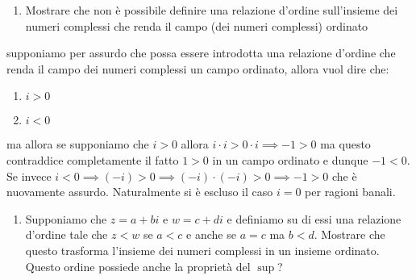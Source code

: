 \documentclass{report}
\begin{document}
\begin{enumerate}[resume, label=\protect\circled{\arabic*}]
	\item Mostrare che non è possibile definire una relazione d'ordine sull'insieme dei numeri complessi che renda il campo (dei numeri complessi) ordinato
\end{enumerate}
\begin{mysolution}
	supponiamo per assurdo che possa essere introdotta una relazione d'ordine che renda il campo dei numeri complessi un campo ordinato, allora vuol dire che:
	\begin{enumerate}[label=\protect\circled{\arabic*}]
		\item $i > 0$
		\item $i < 0$
	\end{enumerate}
	ma allora se supponiamo che $i>0$ allora $i \cdot i > 0 \cdot i \implies -1 > 0$ ma questo contraddice completamente il fatto $1 > 0$ in un campo ordinato e dunque $-1 < 0$. Se invece $i < 0 \implies (-i) > 0 \implies (-i) \cdot (-i) > 0 \implies -1 > 0$ che è nuovamente assurdo. Naturalmente si è escluso il caso $i = 0$ per ragioni banali.
\end{mysolution}
\begin{enumerate}[resume, label=\protect\circled{\arabic*}]
	\item Supponiamo che $z=a+bi$ e $w=c+di$ e definiamo su di essi una relazione d'ordine tale che $z < w$ se $a < c$ e anche se $a=c$ ma $b < d$. Mostrare che questo trasforma l'insieme dei numeri complessi in un insieme ordinato. Questo ordine possiede anche la proprietà del $\sup$?
\end{enumerate}
\end{document}
